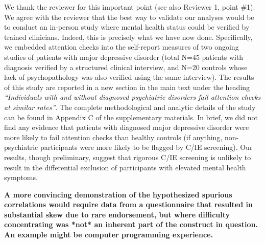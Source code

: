 \documentclass[a4paper,notitlepage,12pt]{article}
\begin{document}
We thank the reviewer for this important point (see also Reviewer 1, point \#1). We agree with the reviewer that the best way to validate our analyses would be to conduct an in-person study where mental health status could be verified by trained clinicians. Indeed, this is precisely what we have now done. Specifically, we embedded attention checks into the self-report measures of two ongoing studies of patients with major depressive disorder (total N=45 patients with diagnosis verified by a structured clinical interview, and N=20 controls whose lack of psychopathology was also verified using the same interview). The results of this study are reported in a new section in the main text under the heading \textit{``Individuals with and without diagnosed psychiatric disorders fail attention checks at similar rates''}. The complete methodological and analytic details of the study can be found in Appendix C of the supplementary materials. In brief, we did not find any evidence that patients with diagnosed major depressive disorder were more likely to fail attention checks than healthy controls (if anything, non-psychiatric participants were more likely to be flagged by C/IE screening). Our results, though preliminary, suggest that rigorous C/IE screening is unlikely to result in the differential exclusion of participants with elevated mental health symptoms.

\textbf{A more convincing demonstration of the hypothesized spurious correlations would require data from a questionnaire that resulted in substantial skew due to rare endorsement, but where difficulty concentrating was *not* an inherent part of the construct in question. An example might be computer programming experience.}
\end{document}
